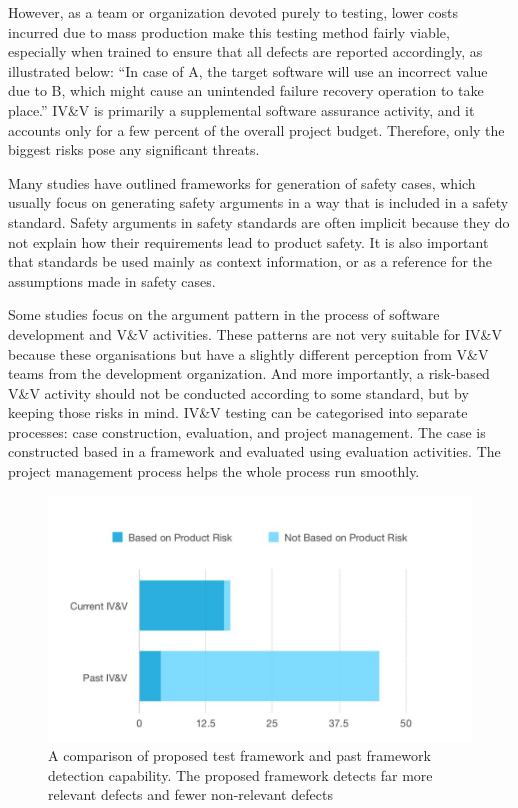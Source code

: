 \documentclass[journal, onecolumn]{IEEEtran}
\begin{document}
	\newline \newline
	However, as a team or organization devoted purely to testing, lower costs incurred due to mass production make this testing method fairly viable, especially when trained to ensure that all defects are reported accordingly, as illustrated below:
	\newline \newline
	“In case of A, the target software will use an incorrect value due to B, which might cause an unintended failure recovery operation to take place.”
	\newline \newline
	IV\&V is primarily a supplemental software assurance activity, and it accounts only for a few percent of the overall project budget. Therefore, only the biggest risks pose any significant threats.

	Many studies have outlined frameworks for generation of safety cases, which usually focus on generating safety arguments in a way that is included in a safety standard. Safety arguments in safety standards are often implicit because they do not explain how their requirements lead to product safety. It is also important that standards be used mainly as context information, or as a reference for the assumptions made in safety cases. 

	Some studies focus on the argument pattern in the process of software development and V\&V activities. These patterns are not very suitable for IV\&V because these organisations but have a slightly different perception from V\&V teams from the development organization. And more importantly, a risk-based V\&V activity should not be conducted according to some standard, but by keeping those risks in mind. 
	\newline \newline
	IV\&V testing can be categorised into separate processes: case construction, evaluation, and project management. The case is constructed based in a framework and evaluated using evaluation activities. The project management process helps the whole process run smoothly.
	
	\begin{figure}[h]
		\includegraphics[scale=0.5]{ivv-defects2.jpeg}
		\centering
		\caption{A comparison of proposed test framework and past framework detection capability. The proposed framework detects far more relevant defects and fewer non-relevant defects}
	\end{figure}
	
\end{document}

